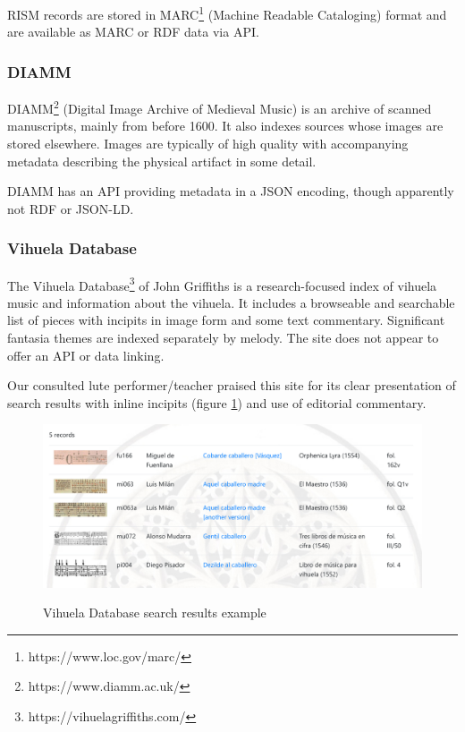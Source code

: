 \documentclass[sigconf]{acmart}
\begin{document}
\begin{sloppypar}
  RISM records are stored in MARC\footnote{https://www.loc.gov/marc/}
  (Machine Readable Cataloging) format and are available as MARC or
  RDF data via API.

  \subsubsection{DIAMM}

  DIAMM\footnote{https://www.diamm.ac.uk/} (Digital Image Archive of
  Medieval Music) is an archive of scanned manuscripts, mainly from
  before 1600. It also indexes sources whose images are stored
  elsewhere. Images are typically of high quality with accompanying
  metadata describing the physical artifact in some detail.

  DIAMM has an API providing metadata in a JSON encoding, though
  apparently not RDF or JSON-LD.
  
  \subsubsection{Vihuela Database}

  The Vihuela Database\footnote{https://vihuelagriffiths.com/} of John
  Griffiths is a research-focused index of vihuela music and
  information about the vihuela. It includes a browseable and
  searchable list of pieces with incipits in image form and some text
  commentary. Significant fantasia themes are indexed separately by
  melody. The site does not appear to offer an API or data linking.

  Our consulted lute performer/teacher praised this site for its clear
  presentation of search results with inline incipits (figure
  \ref{fig:vihuela}) and use of editorial commentary.
  
  \begin{figure}[h]
  \centering
  \caption{Vihuela Database search results example}
  \includegraphics[width=\columnwidth]{images/vihuela-search-results}
  \label{fig:vihuela}
  \end{figure}
  

\end{sloppypar}
\end{document}
